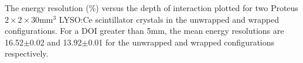 \label{fig:energyresolution} The energy resolution ($\%$) versus the depth of interaction plotted for two Proteus $2\times2\times30$mm$^3$ LYSO:Ce scintillator crystals in the unwrapped and wrapped configurations. For a DOI greater than 5mm, the mean energy resolutions are 16.52$\pm$0.02 and 13.92$\pm$0.01 for the unwrapped and wrapped configurations respectively.